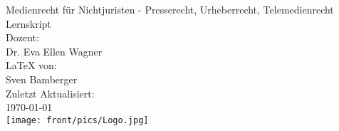 \begin{titlepage}
\center
\Large Medienrecht für Nichtjuristen - Presserecht, Urheberrecht, Telemedienrecht\large \\[2em]
Lernskript \\[2em]
Dozent:\\Dr. Eva Ellen Wagner \\[2em]
\LaTeX{} von:\\Sven Bamberger\\[2em]
Zuletzt Aktualisiert:\\\today\\
\texttt{[image: front/pics/Logo.jpg]}\\\quad\\
\end{titlepage}
